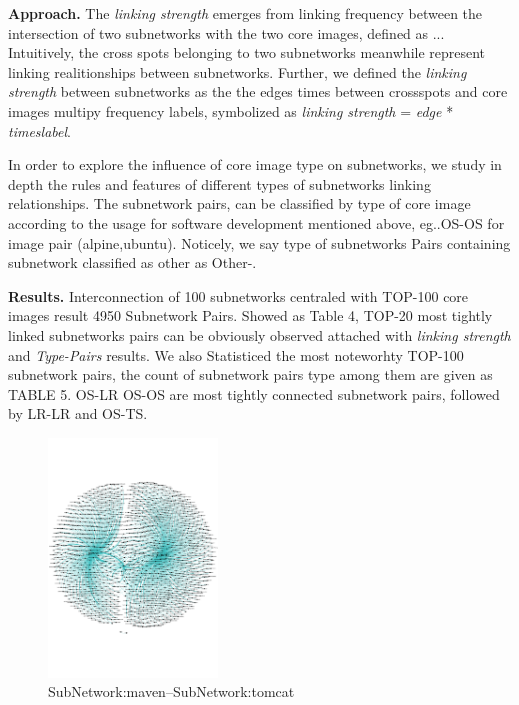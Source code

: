\documentclass[sigconf]{acmart}
\begin{document}

\noindent\textbf{Approach. }
The \emph{linking strength} emerges from linking frequency between the intersection of two subnetworks with the two core images, defined as ...
Intuitively, the cross spots belonging to two subnetworks meanwhile represent linking realitionships between subnetworks. Further, we defined the \emph{linking strength} between subnetworks as the the edges times between crossspots and core images multipy frequency labels, symbolized as \emph{linking strength} = \emph{edge} * \emph{timeslabel}. 

In order to explore the influence of core image type on subnetworks, we study in depth the rules and features of different types of subnetworks linking relationships. The subnetwork pairs, can be classified by type of core image according to the usage for software development mentioned above, eg..OS-OS for image pair (alpine,ubuntu).  Noticely, we say type of subnetworks Pairs containing subnetwork classified as other as Other-.




\noindent\textbf{Results. }Interconnection of 100 subnetworks centraled with TOP-100 core images result 4950 Subnetwork Pairs.  Showed as Table 4, TOP-20 most tightly linked subnetworks pairs can be obviously observed attached with \emph{linking strength} and \emph{Type-Pairs} results. 
We also Statisticed the most noteworhty TOP-100 subnetwork pairs, the count of subnetwork pairs type among them are given as TABLE 5. OS-LR OS-OS are most tightly connected subnetwork pairs, followed by LR-LR and OS-TS. 


\begin{figure}[htbp]
\centerline{\includegraphics[width=0.4\textwidth,trim=0 130 0 130,clip]{picture//image_network_pairs_maven_tomcat3.pdf}}
\caption{SubNetwork:maven--SubNetwork:tomcat}
\label{fig}
\end{figure}
\end{document}
